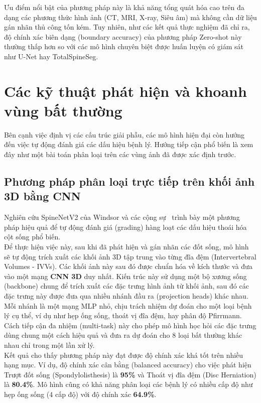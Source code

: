 Ưu điểm nổi bật của phương pháp này là khả năng tổng quát hóa cao trên đa dạng các phương thức hình ảnh (CT, MRI, X-ray, Siêu âm) mà không cần dữ liệu gán nhãn thủ công tốn kém. Tuy nhiên, như các kết quả thực nghiệm đã chỉ ra, độ chính xác biên dạng (boundary accuracy) của phương pháp Zero-shot này thường thấp hơn so với các mô hình chuyên biệt được huấn luyện có giám sát như U-Net hay TotalSpineSeg.
\section{Các kỹ thuật phát hiện và khoanh vùng bất thường}

Bên cạnh việc định vị các cấu trúc giải phẫu, các mô hình hiện đại còn hướng đến việc tự động đánh giá các dấu hiệu bệnh lý. Hướng tiếp cận phổ biến là xem đây như một bài toán phân loại trên các vùng ảnh đã được xác định trước.

\subsection{Phương pháp phân loại trực tiếp trên khối ảnh 3D bằng CNN}

Nghiên cứu SpineNetV2 của Windsor và các cộng sự~\cite{windsor2022spinenetv2} trình bày một phương pháp hiệu quả để tự động đánh giá (grading) hàng loạt các dấu hiệu thoái hóa cột sống phổ biến.\\

Để thực hiện việc này, sau khi đã phát hiện và gán nhãn các đốt sống, mô hình sẽ tự động trích xuất các khối ảnh 3D tập trung vào từng đĩa đệm (Intervertebral Volumes - IVVs). Các khối ảnh này sau đó được chuẩn hóa về kích thước và đưa vào một mạng \textbf{CNN 3D} duy nhất. Kiến trúc này sử dụng một bộ xương sống (backbone) chung để trích xuất các đặc trưng hình ảnh từ khối ảnh, sau đó các đặc trưng này được đưa qua nhiều nhánh đầu ra (projection heads) khác nhau. Mỗi nhánh là một mạng MLP nhỏ, chịu trách nhiệm dự đoán cho một loại bệnh lý cụ thể, ví dụ như hẹp ống sống, thoát vị đĩa đệm, hay phân độ Pfirrmann. Cách tiếp cận đa nhiệm (multi-task) này cho phép mô hình học hỏi các đặc trưng dùng chung một cách hiệu quả và đưa ra dự đoán cho 8 loại bất thường khác nhau chỉ trong một lần xử lý.\\

Kết quả cho thấy phương pháp này đạt được độ chính xác khá tốt trên nhiều hạng mục. Ví dụ, độ chính xác cân bằng (balanced accuracy) cho việc phát hiện Trượt đốt sống (Spondylolisthesis) là \textbf{95\%} và Thoát vị đĩa đệm (Disc Herniation) là \textbf{80.4\%}. Mô hình cũng có khả năng phân loại các bệnh lý có nhiều cấp độ như hẹp ống sống (4 cấp độ) với độ chính xác \textbf{64.9\%}.\\


